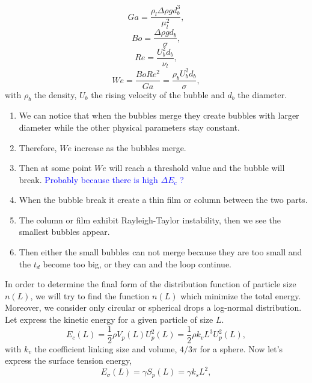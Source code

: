 \documentclass[10pt,a4paper,openany]{article}
\theoremstyle{mytheoremstyle}
\theoremstyle{mytheoremstyle}
\theoremstyle{myproblemstyle}
\begin{document}
\begin{equation*}
    Ga =\frac{\rho_l\Delta\rho g d_b^3}{\mu^2_l},
\end{equation*}
\begin{equation*}
    Bo =\frac{\Delta\rho g d_b}{\sigma},
\end{equation*}
\begin{equation*}
    Re =\frac{U_b^2 d_b}{\nu_l},
\end{equation*}
\begin{equation*}
    We = \frac{BoRe^2}{Ga}=\frac{\rho_b U_b^2 d_b}{\sigma},
\end{equation*}
with $\rho_b$ the density, $U_b$ the rising velocity of the bubble and $d_b$ the diameter. 
\begin{enumerate}
    \item We can notice that when the bubbles merge they create bubbles with larger diameter while the other physical parameters stay constant. 
    \item Therefore, $We$ increase as the bubbles merge.
    \item Then at some point $We$ will reach a threshold value and the bubble will break. 
    \textcolor{blue}{Probably because there is high $\Delta E_c$ ?}
    \item When the bubble break it create a thin film or column between the two parts.
    \item The column or film exhibit Rayleigh-Taylor instability, then we see the smallest bubbles appear. 
    \item Then either the small bubbles can not merge because they are too small and the $t_d$ become too big, or they can and the loop continue.
\end{enumerate}
In order to determine the final form of the distribution function of particle size $n(L)$,
we will try to find the function $n(L)$ which minimize the total energy.
Moreover, we consider only circular or spherical drops a log-normal distribution.
Let express the kinetic energy for a given particle of size $L$. 
\begin{equation}
    E_c(L) = \frac{1}{2} \rho V_p(L) U_p^2(L) =\frac{1}{2} \rho k_v L^3 U_p^2(L) ,
    \label{eq:Ec}
\end{equation}
with $k_v$ the coefficient linking size and volume, $4/3 \pi$ for a sphere. 
Now let's express the surface tension energy,
\begin{equation}
    E_\sigma(L) = \gamma S_p(L) =\gamma k_s L^2 ,
    \label{eq:Es}
\end{equation}
\end{document}
